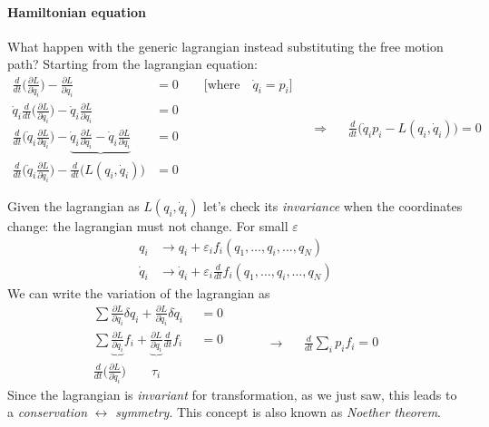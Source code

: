 \documentclass[class=article]{standalone}
\begin{document}
\paragraph{Hamiltonian equation}
What happen with the generic lagrangian instead substituting the free motion path?
Starting from the lagrangian equation:
\begin{equation*}
\begin{split}
\frac{d }{d t } \Big( \frac{\partial L}{\partial \dot q_i } \Big) - \frac{\partial L}{\partial q_i }  & = 0  \quad\quad  \Big[ \mbox{where}\quad \dot q_i = p_i \Big]  \\ 
\dot q_i \frac{d }{d t } \Big( \frac{\partial L}{\partial \dot q_i } \Big) - \dot q_i \frac{\partial L}{\partial q_i } & = 0 \\
\frac{d }{d t } \Big( \dot  q_i \frac{\partial L}{\partial \dot q_i } \Big) - \underbrace{ \dot  q_i \frac{\partial L}{\partial \dot  q_i} - \dot  q_i \frac{\partial L}{\partial  q_i } } & = 0 \\
\frac{d }{d t } \Big( \dot  q_i \frac{\partial L}{\partial \dot q_i } \Big) -  \frac{d }{d t } \Big( L (q_i, \dot q_i) \Big) & = 0
\end{split}\quad\Rightarrow\quad
\begin{split}
\frac{d }{d t } \Big( \dot q_i p_i - L(q_i, \dot q_i) \Big) = 0
\end{split}
\end{equation*}

Given the lagrangian as $L(q_i, \dot q_i)$ let's check its \emph{invariance} when the coordinates change: the lagrangian must not change.
For small $\varepsilon$
\begin{equation*}
\begin{split}
q_i  & \to q_i + \varepsilon_i f_i(q_1, \ldots, q_i, \ldots, q_N) \\
\dot q_i  & \to \dot q_i + \varepsilon_i \frac{d }{d t }  f_i(q_1, \ldots, q_i, \ldots, q_N)
\end{split}
\end{equation*}
We can write the variation of the lagrangian as
\begin{equation*}
\begin{split}
\sum \frac{\partial L}{\partial q_i } \delta q_i + \frac{\partial L}{\partial \dot q_i } \delta \dot q_i & = 0 \\
\sum \underbrace{ \frac{\partial L}{\partial q_i } } f_i + \underbrace{ \frac{\partial L}{\partial \dot q_i }} \frac{d }{d t } f_i & = 0 \\
\frac{d }{d t } \Big( \frac{\partial L}{\partial \dot q_i }  \Big) \quad\quad \tau_i \quad\quad\; &
\end{split}\quad\quad\quad\longrightarrow\quad
\begin{split}
\frac{d }{d t } \sum_i p_i f_i = 0
\end{split}
\end{equation*}
Since the lagrangian is \emph{invariant} for transformation, as we just saw, this leads to a \emph{conservation} $\leftrightarrow$ \emph{symmetry}.
This concept is also known as \emph{Noether theorem}.
\end{document}
